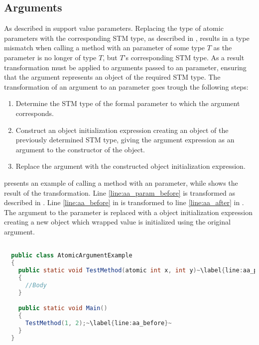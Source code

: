 \subsection{Arguments}
As described in  \stmnamesp support value parameters. Replacing the type of atomic parameters with the corresponding \ac{STM} type, as described in , results in a type mismatch when calling a method with an  parameter of some type $T$ as the parameter is no longer of type $T$, but $T$'s corresponding \ac{STM} type. As a result transformation must be applied to arguments passed to an  parameter, ensuring that the argument represents an object of the required \ac{STM} type. The transformation of an argument to an  parameter goes trough the following steps:

\begin{enumerate}
	\item Determine the \ac{STM} type of the formal parameter to which the argument corresponds.
	\item Construct an object initialization expression creating an object of the previously determined \ac{STM} type, giving the argument expression as an argument to the constructor of the object.
	\item Replace the argument with the constructed object initialization expression.
\end{enumerate}

 presents an example of calling a method with an  parameter, while  shows the result of the transformation. Line \ref{line:aa_param_before} is transformed as described in . Line \ref{line:aa_before} in  is transformed to line \ref{line:aa_after} in . The argument to the  parameter is replaced with a object initialization expression creating a new  object which wrapped value is initialized using the original argument.

\begin{lstlisting}[label=lst:before_atomic_argument,
  caption={\bscode{atomic} Argument Before Transformation},
  language=Java,  
  showspaces=false,
  showtabs=false,
  breaklines=true,
  showstringspaces=false,
  breakatwhitespace=true,
  escapechar=~,
  commentstyle=\color{greencomments},
  keywordstyle=\color{bluekeywords},
  stringstyle=\color{redstrings},
  morekeywords={atomic, retry, orelse, var, get, set, ret, out}]  % Start your code-block

  public class AtomicArgumentExample
  {
    public static void TestMethod(atomic int x, int y)~\label{line:aa_param_before}~
    {
      //Body
    }

    public static void Main()
    {
      TestMethod(1, 2);~\label{line:aa_before}~
    }
  }
\end{lstlisting}

